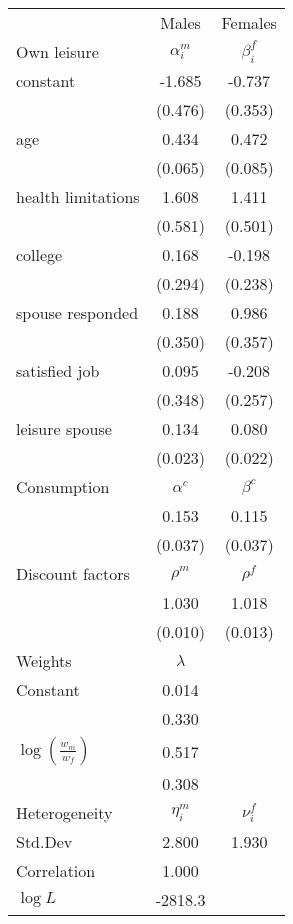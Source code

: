 \begin{tabular}{lcc} 
\hline\hline 
 & Males & Females \\ 
Own leisure & $\alpha_{i}^{m}$ & $\beta_{i}^{f}$ \\ 
constant & -1.685 & -0.737 \\ 
 & (0.476) & (0.353) \\ 
age & 0.434 & 0.472 \\ 
 & (0.065) & (0.085) \\ 
health limitations & 1.608 & 1.411 \\ 
 & (0.581) & (0.501) \\ 
college & 0.168 & -0.198 \\ 
 & (0.294) & (0.238) \\ 
spouse responded & 0.188 & 0.986 \\ 
 & (0.350) & (0.357) \\ 
satisfied job & 0.095 & -0.208 \\ 
 & (0.348) & (0.257) \\ 
leisure spouse & 0.134 & 0.080 \\ 
 & (0.023) & (0.022) \\ 
Consumption & $\alpha^{c}$ & $\beta^{c}$ \\ 
 & 0.153 & 0.115 \\ 
 & (0.037) & (0.037) \\ 
Discount factors & $\rho^m$ & $\rho^f$ \\ 
 & 1.030 & 1.018 \\ 
 & (0.010) & (0.013) \\ 
Weights & $\lambda$ &  \\ 
Constant & 0.014 &  \\ 
 & 0.330 &  \\ 
$\log(\frac{w_m}{w_f})$ & 0.517 &  \\ 
 & 0.308 &  \\ 
Heterogeneity & $\eta_i^m$ & $\nu_i^f$ \\ 
Std.Dev & 2.800 & 1.930 \\ 
Correlation & 1.000 &  \\ 
\hline 
$\log L$ & -2818.3 & \\ 
\hline \hline 
\end{tabular} 
